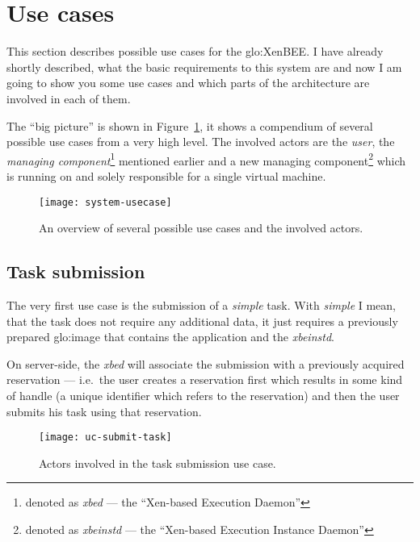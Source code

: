 \section{Use cases}
\label{sec:use-cases}

This section describes possible use cases for the \gls{glo:XenBEE}. I have
already shortly described, what the  basic requirements to this system are
and now  I am  going to show  you some  use cases and  which parts  of the
architecture are involved in each of them.

The ``big picture'' is shown in Figure~\ref{fig:system-usecases}, it shows
a compendium  of several possible  use cases from  a very high  level. The
involved    actors    are     the    \emph{user},    the    \emph{managing
  component}\footnote{denoted as \emph{xbed} --- the ``Xen-based Execution
  Daemon''}     mentioned      earlier     and     a      new     managing
component\footnote{denoted   as   \emph{xbeinstd}   ---  the   ``Xen-based
  Execution Instance Daemon''} which  is running on and solely responsible
for a single virtual machine.

\begin{figure}[htbp]
  \centering
  \texttt{[image: system-usecase]}
  \caption[Use case  overview]{An overview  of several possible  use cases
    and the involved actors.}
  \label{fig:system-usecases}
\end{figure}


\subsection{Task submission}
\label{sec:uc-task-submission}

The very  first use case is  the submission of a  \emph{simple} task. With
\emph{simple} I mean, that the  task does not require any additional data,
it just  requires a previously prepared \gls{glo:image}  that contains the
application and the \emph{xbeinstd}.

On  server-side, the  \emph{xbed}  will associate  the  submission with  a
previously acquired  reservation ---  i.e.~the user creates  a reservation
first  which results in  some kind  of handle  (a unique  identifier which
refers to the  reservation) and then the user submits  his task using that
reservation.

\begin{figure}[htbp]
  \centering
  \texttt{[image: uc-submit-task]}
  \caption[UC Task submission]{Actors involved  in the task submission use
    case.}
  \label{fig:uc-submit-task}
\end{figure}

